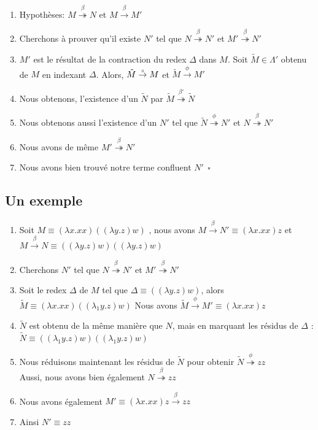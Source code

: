 \begin{enumerate}
	\item Hypothèses: $M\stackrel{\beta}{\twoheadrightarrow} N$ et
                    $M\stackrel{\beta}{\rightarrow} M'$        
       \item Cherchons à prouver qu'il existe $N'$ tel que  $N\stackrel{\beta}{\twoheadrightarrow} N'$ 
et  $M' \stackrel{\beta}{\twoheadrightarrow} N'$ 
        \item $M'$ est le résultat de la contraction du redex $\Delta$ dans $M$. Soit $\tilde{M} \in \Lambda '$
        obtenu de $M$ en indexant $\Delta$. Alors, $ \tilde{M} \stackrel{\shortparallel}{\rightarrow} M$ et 
       $ \tilde{M} \stackrel{\phi}{\rightarrow} M'$ 
       \item Nous obtenons, l'existence d'un $\tilde{N}$ par $\tilde{M}\stackrel{\beta '}\twoheadrightarrow \tilde{N}$
       \item Nous obtenons aussi l'existence d'un $N'$ tel que $\tilde{N} \stackrel{\phi}{\twoheadrightarrow} N'$
       et $N \stackrel{\beta}{\twoheadrightarrow} N'$
       \item Nous avons de même $M' \stackrel{\beta}{\twoheadrightarrow} N'$
       \item Nous avons bien trouvé notre terme confluent $N'\ \  \square $

\end{enumerate}

\subsection{Un exemple}
\begin{enumerate}
	\item Soit $M \equiv (\lambda x.xx)((\lambda y.z)w)$ , nous avons 
	$M \stackrel{\beta}{\rightarrow} N' \equiv (\lambda x.xx)z$ et $M \stackrel{\beta}{\rightarrow} N \equiv ((\lambda y.z)w)((\lambda y.z)w)$
       \item Cherchons  $N'$ tel que  $N\stackrel{\beta}{\twoheadrightarrow} N'$ 
et  $M' \stackrel{\beta}{\twoheadrightarrow} N'$ 
	\item  Soit le redex $\Delta$ de $M$ tel que $\Delta \equiv ((\lambda y.z)w)$, alors $\tilde{M} \equiv (\lambda x.xx)((\lambda_1 y.z)w)$
	Nous avons $\tilde{M}  \stackrel{\phi}{\rightarrow} M' \equiv (\lambda x.xx)z$
	\item $\tilde{N}$ est obtenu de la même manière que $N$, mais en marquant les résidus de $\Delta$ :
	 $\tilde{N} \equiv  ((\lambda _1 y.z)w)((\lambda _1 y.z)w)$

	 \item  Nous réduisons maintenant les résidus de $\tilde{N}$ pour obtenir
	  $\tilde{N}  \stackrel{\phi}{\twoheadrightarrow} zz$ \\
	  Aussi, nous avons bien également $N \stackrel{\beta}{\twoheadrightarrow} zz$

	 \item Nous avons également $M' \equiv (\lambda x.xx)z \stackrel{\beta}{\rightarrow} zz$
	 \item Ainsi $N' \equiv zz$
\end{enumerate}

